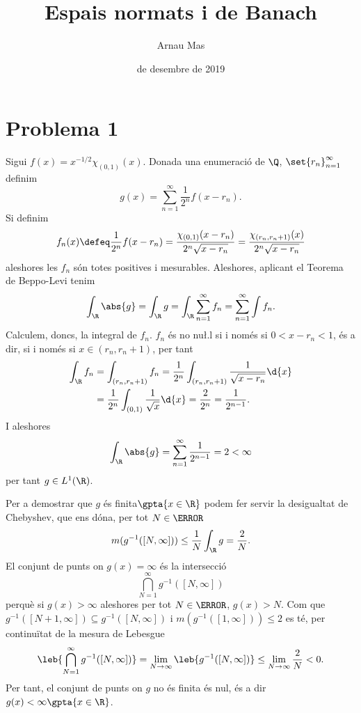 \documentclass[12pt]{article}
\title{\sffamily {\bfseries Entrega 2:} Espais normats i de Banach}
\author{\sffamily Arnau Mas}
\date{\sffamily 6 de desembre de 2019}
\begin{document}
\maketitle
\section*{Problema 1}
Sigui \( f(x) = x^{-1/2}\chi_{(0,1)}(x) \). Donada una enumeració de \( \Q \), \(
\set{r_n}_{n = 1}^\infty \) definim
\begin{equation*}
	g(x) = \sum_{n = 1}^{\infty} \frac{1}{2^n} f(x - r_n).
\end{equation*}
Si definim 
\begin{equation*}
	f_n(x) \defeq \frac{1}{2^n}f(x - r_n) = \frac{\chi_{(0,1)}(x - r_n)}{2^n\sqrt{x - r_n}}
	= \frac{\chi_{(r_n, r_n + 1)}(x)}{2^n \sqrt{x - r_n}}
\end{equation*}
aleshores les \( f_n \) són totes positives i mesurables. Aleshores, aplicant el Teorema
de Beppo-Levi tenim
\begin{equation*}
	\int_\R \abs{g} = \int_\R g = \int_\R \sum_{n = 1}^{\infty} f_n = \sum_{n = 1}^{\infty} \int f_n.  
\end{equation*}
Calculem, doncs, la integral de \( f_n \). \( f_n \) és no nu\l.l si i només si \( 0 < x -
r_n < 1 \), és a dir, si i només si \( x \in (r_n, r_n + 1) \), per tant
\begin{align*}
	\int_\R f_n & = \int_{(r_n, r_n + 1)} f_n = \frac{1}{2^n}\int_{(r_n, r_n + 1)}
	\frac{1}{\sqrt{x - r_n}} \d{x} \\
							& = \frac{1}{2^n} \int_{(0,1)} \frac{1}{\sqrt{x}} \d{x} = \frac{2}{2^n} =
							\frac{1}{2^{n-1}}.
\end{align*}
I aleshores
\begin{equation*}
	\int_\R \abs{g} = \sum_{n = 1}^{\infty} \frac{1}{2^{n-1}} = 2 < \infty
\end{equation*}
per tant \( g \in L^1(\R) \).

Per a demostrar que \( g \) és finita\( \gpta{x \in \R} \) podem fer servir la desigualtat de Chebyshev, que
ens dóna, per tot \( N \in \N \)
\begin{equation*}
	m(g^{-1}([N,\infty])) \leq \frac{1}{N} \int_\R g = \frac{2}{N}.
\end{equation*}
El conjunt de punts on \( g(x) = \infty \) és la intersecció
\begin{equation*}
	\bigcap_{N = 1}^\infty g^{-1}([N, \infty])	
\end{equation*}
perquè si \( g(x) > \infty \) aleshores per tot \( N \in \N \), \( g(x) > N \). Com que \(
g^{-1}([N+1, \infty]) \subseteq g^{-1}([N, \infty]) \) i \( m(g^{-1}([1,\infty])) \leq 2 \)
es té, per continuïtat de la mesura de Lebesgue
\begin{equation*}
	\leb{\bigcap_{N = 1}^\infty g^{-1}([N, \infty])} = \lim_{N \to \infty} \leb{g^{-1}([N,
	\infty])} \leq \lim_{N \to \infty} \frac{2}{N} < 0.
\end{equation*}
Per tant, el conjunt de punts on \( g \) no és finita és nul, és a dir \( g(x) < \infty \gpta{x
\in \R} \).
\end{document}
